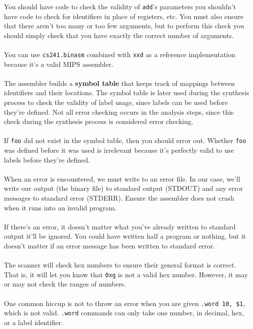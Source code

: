 \documentclass[]{article}
\theoremstyle{definition}
\begin{document}
				You should have code to check the validity of \verb+add+'s parameters \textendash{} you shouldn't have code to check for identifiers in place of registers, etc. You must also ensure that there aren't too many or too few arguments, but to perform this check you should simply check that you have exactly the correct number of arguments.
				\\ \\
				You can use \verb+cs241.binasm+ combined with \verb+xxd+ as a reference implementation because it's a valid MIPS assembler.
				\\ \\
				The assembler builds a \textbf{symbol table} that keeps track of mappings between identifiers and their locations. The symbol table is later used during the synthesis process to check the validity of label usage, since labels can be used before they're defined. Not all error checking occurs in the analysis steps, since this check during the synthesis process is considered error checking.
				\\ \\
				If \verb+foo+ did not exist in the symbol table, then you should error out. Whether \verb+foo+ was defined before it was used is irrelevant because it's perfectly valid to use labels before they're defined.
				\\ \\
				When an error is encountered, we must write to an error file. In our case, we'll write our output (the binary file) to standard output (STDOUT) and any error messages to standard error (STDERR). Ensure the assembler does not crash when it runs into an invalid program.
				\\ \\
				If there's an error, it doesn't matter what you've already written to standard output \textendash{} it'll be ignored. You could have written half a program or nothing, but it doesn't matter if an error message has been written to standard error.
				\\ \\
				The scanner will check hex numbers to ensure their general format is correct. That is, it will let you know that \verb+0xg+ is not a valid hex number. However, it may or may not check the ranges of numbers.
				\\ \\
				One common hiccup is not to throw an error when you are given \verb+.word 10, $1+, which is not valid. \verb+.word+ commands can only take one number, in decimal, hex, or a label identifier.
\end{document}
